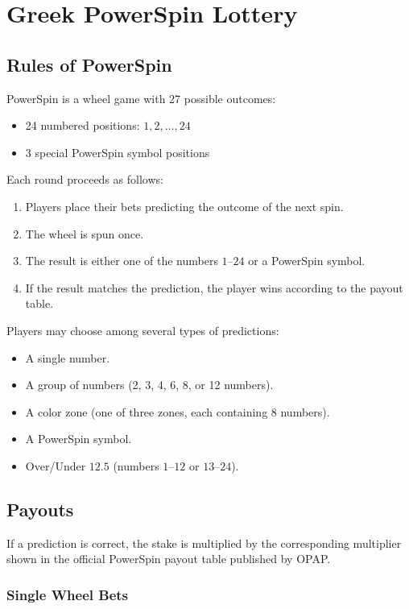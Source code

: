 \chapter{Greek PowerSpin Lottery}
\section{Rules of PowerSpin}

PowerSpin is a wheel game with 27 possible outcomes:
\begin{itemize}
\item 24 numbered positions: $1,2,\ldots,24$
\item 3 special PowerSpin symbol positions
\end{itemize}

Each round proceeds as follows:
\begin{enumerate}
\item Players place their bets predicting the outcome of the next spin.
\item The wheel is spun once.
\item The result is either one of the numbers $1$--$24$ or a PowerSpin symbol.
\item If the result matches the prediction, the player wins according to the payout table.
\end{enumerate}

Players may choose among several types of predictions:
\begin{itemize}
\item A single number.
\item A group of numbers (2, 3, 4, 6, 8, or 12 numbers).
\item A color zone (one of three zones, each containing 8 numbers).
\item A PowerSpin symbol.
\item Over/Under $12.5$ (numbers $1$--$12$ or $13$--$24$).
\end{itemize}

\section{Payouts}

If a prediction is correct, the stake is multiplied by the corresponding multiplier shown in the official PowerSpin payout table published by OPAP.

\subsection{Single Wheel Bets}

